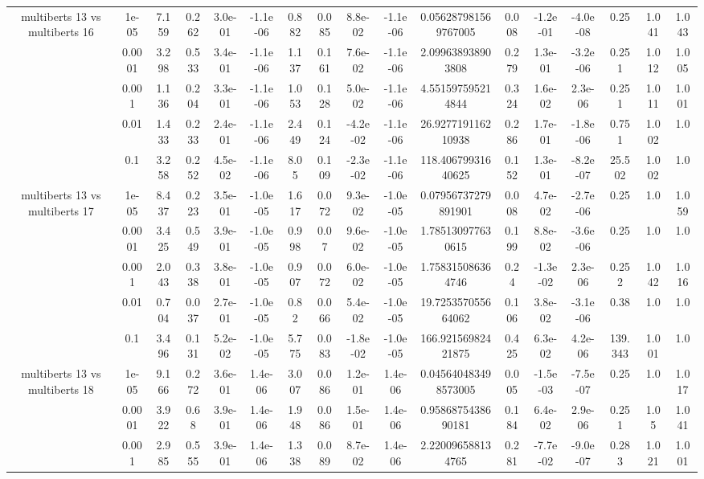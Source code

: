 \begin{tabular}{|c|c|c|c|c|c|c|c|c|c|c|c|c|c|c|c|c|}
\hline
\multirow{5}{*}{multiberts 13 vs multiberts 16} & 1e-05 & 7.159 & 0.262 & 3.0e-01 & -1.1e-06 & 0.882 & 0.085 & 8.8e-02 & -1.1e-06 & 0.056287981569767005 & 0.008 & -1.2e-01 & -4.0e-08 & 0.25 & 1.041 & 1.043 \\
 & 0.0001 & 3.298 & 0.533 & 3.4e-01 & -1.1e-06 & 1.137 & 0.161 & 7.6e-02 & -1.1e-06 & 2.099638938903808 & 0.279 & 1.3e-01 & -3.2e-06 & 0.251 & 1.012 & 1.005 \\
 & 0.001 & 1.136 & 0.204 & 3.3e-01 & -1.1e-06 & 1.053 & 0.128 & 5.0e-02 & -1.1e-06 & 4.551597595214844 & 0.324 & 1.6e-02 & 2.3e-06 & 0.251 & 1.011 & 1.001 \\
 & 0.01 & 1.433 & 0.233 & 2.4e-01 & -1.1e-06 & 2.449 & 0.124 & -4.2e-02 & -1.1e-06 & 26.927719116210938 & 0.286 & 1.7e-01 & -1.8e-06 & 0.751 & 1.002 & 1.0 \\
 & 0.1 & 3.258 & 0.252 & 4.5e-02 & -1.1e-06 & 8.05 & 0.109 & -2.3e-02 & -1.1e-06 & 118.40679931640625 & 0.152 & 1.3e-01 & -8.2e-07 & 25.502 & 1.002 & 1.0 \\
\hline
\multirow{5}{*}{multiberts 13 vs multiberts 17} & 1e-05 & 8.437 & 0.223 & 3.5e-01 & -1.0e-05 & 1.617 & 0.072 & 9.3e-02 & -1.0e-05 & 0.07956737279891901 & 0.008 & 4.7e-02 & -2.7e-06 & 0.25 & 1.0 & 1.059 \\
 & 0.0001 & 3.425 & 0.549 & 3.9e-01 & -1.0e-05 & 0.998 & 0.07 & 9.6e-02 & -1.0e-05 & 1.785130977630615 & 0.199 & 8.8e-02 & -3.6e-06 & 0.25 & 1.0 & 1.0 \\
 & 0.001 & 2.043 & 0.338 & 3.8e-01 & -1.0e-05 & 0.907 & 0.072 & 6.0e-02 & -1.0e-05 & 1.758315086364746 & 0.24 & -1.3e-02 & 2.3e-06 & 0.252 & 1.042 & 1.016 \\
 & 0.01 & 0.704 & 0.037 & 2.7e-01 & -1.0e-05 & 0.82 & 0.066 & 5.4e-02 & -1.0e-05 & 19.725357055664062 & 0.106 & 3.8e-02 & -3.1e-06 & 0.38 & 1.0 & 1.0 \\
 & 0.1 & 3.496 & 0.131 & 5.2e-02 & -1.0e-05 & 5.775 & 0.083 & -1.8e-02 & -1.0e-05 & 166.92156982421875 & 0.425 & 6.3e-02 & 4.2e-06 & 139.343 & 1.001 & 1.0 \\
\hline
\multirow{5}{*}{multiberts 13 vs multiberts 18} & 1e-05 & 9.166 & 0.272 & 3.6e-01 & 1.4e-06 & 3.007 & 0.086 & 1.2e-01 & 1.4e-06 & 0.045640483498573005 & 0.005 & -1.5e-03 & -7.5e-07 & 0.25 & 1.0 & 1.017 \\
 & 0.0001 & 3.922 & 0.68 & 3.9e-01 & 1.4e-06 & 1.948 & 0.086 & 1.5e-01 & 1.4e-06 & 0.9586875438690181 & 0.184 & 6.4e-02 & 2.9e-06 & 0.251 & 1.05 & 1.041 \\
 & 0.001 & 2.985 & 0.555 & 3.9e-01 & 1.4e-06 & 1.338 & 0.089 & 8.7e-02 & 1.4e-06 & 2.220096588134765 & 0.281 & -7.7e-02 & -9.0e-07 & 0.283 & 1.021 & 1.001 \\

\end{tabular}
